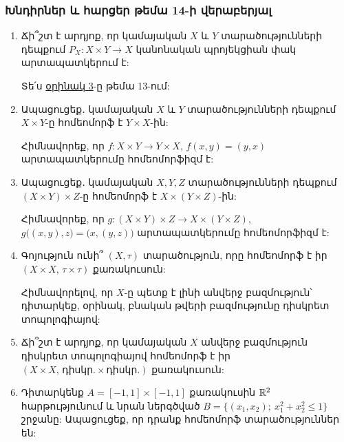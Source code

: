 \bigskip
\bigskip
\subsubsection*{Խնդիրներ և հարցեր թեմա 14-ի վերաբերյալ}

\begin{enumerate}[label=\thesection.\arabic*.]

\item Ճի՞շտ է արդյոք, որ կամայական $X$ և $Y$ տարածությունների դեպքում \linebreak $P_X: X \times Y \to X$ կանոնական պրոյեկցիան փակ արտապատկերում է:

\begin{hint}
Տե՛ս \hyperref[ch13ex3]{օրինակ 3}-ը թեմա 13-ում:
\end{hint}

\item Ապացուցեք․ կամայական $X$ և $Y$ տարածությունների դեպքում $X \times Y$-ը հո\-մե\-ո\-մորֆ է $Y \times X$-ին:

\begin{hint}
Հիմնավորեք, որ $f: X \times Y \to Y \times X$, $f(x,y)=(y,x)$ արտա\-պատ\-կերումը հոմեոմորֆիզմ է:
\end{hint}

\item Ապացուցեք․ կամայական $X, Y, Z$ տարածությունների դեպքում $(X \times Y) \times Z$-ը հոմեոմորֆ է $X \times (Y \times Z)$-ին:

\begin{hint}
Հիմնավորեք, որ $g: (X \times Y) \times Z \to X \times (Y \times Z)$, $g\big((x,y),z\big)=\big(x,(y,z)\big)$ արտապատկերումը հոմեոմորֆիզմ է:
\end{hint}

\item Գոյություն ունի՞ $(X, \tau)$ տարածություն, որը հոմեոմորֆ է իր $(X \times X,\, \tau \times \tau)$ քառակուսուն:

\begin{hint}
Հիմնավորելով, որ $X$-ը պետք է լինի անվերջ բազմություն՝ դիտ\-ար\-կեք, օրինակ, բնական թվերի բազմությունը դիսկրետ տոպոլոգիայով:
\end{hint}

\item Ճի՞շտ է արդյոք, որ կամայական $X$ անվերջ բազմություն դիսկրետ տոպոլո\-գի\-ա\-յով հոմեոմորֆ է իր $(X \times X,\, \text{դիսկր.} \times \text{դիսկր.})$ քառակուսուն:

\item Դիտարկենք $A=[-1,1] \times [-1,1]$ քառակուսին $\mathbb{R}^2$ հարթությունում և նրան ներգծված $B=\{(x_1, x_2);\ x_1^2+x_2^2 \le 1\}$ շրջանը: Ապացուցեք, որ դրանք հոմեո\-մորֆ տարածություններ են:


\end{enumerate}
